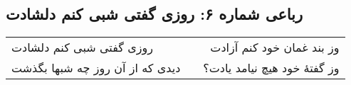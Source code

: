 \begin{center}
\section*{رباعی شماره ۶: روزی گفتی شبی کنم دلشادت}
\label{sec:006}
\begin{longtable}{l p{0.5cm} r}
روزی گفتی شبی کنم دلشادت
&&
وز بند غمان خود کنم آزادت
\\
دیدی که از آن روز چه شبها بگذشت
&&
وز گفتهٔ خود هیچ نیامد یادت؟
\\
\end{longtable}
\end{center}
